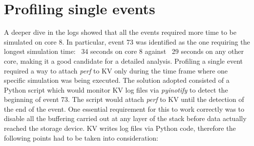 \documentclass[a4paper]{jpconf}
\begin{document}
\section{Profiling single events}
A deeper dive in the logs showed that all the events required more time to be
simulated on core 8. In particular, event 73 was identified as the one
requiring the longest simulation time: ~34 seconds on core 8 against ~29 seconds
on any other core, making it a good candidate for a detailed analysis. Profiling
a single event required a way to attach \textit{perf} to KV only during the time frame
where one specific simulation was being executed. The solution adopted consisted
of a Python script which would monitor KV log files via \textit{pyinotify} to detect
the beginning of event 73. The script would attach \textit{perf} to KV until the
detection of the end of the event. One essential requirement for this to work correctly
was to disable all the buffering carried out at any layer of the stack before
data actually reached the storage device. KV writes log files via Python code,
therefore the following points had to be taken into consideration:

\end{document}
